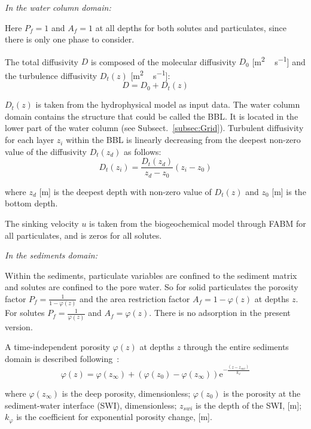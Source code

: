 \documentclass[gmd, manuscript]{copernicus}
\begin{document}
\emph{In the water column domain:}

Here $P_{f} = 1$ and $A_{f} = 1$ at all depths for both solutes and particulates, since there is only one phase to consider.

The total diffusivity $D$ is composed of the molecular diffusivity $D_{0}$ [\unit{m^{2}\,s^{-1}}] and the turbulence diffusivity $D_{t}(z)$ [\unit{m^{2}\,s^{-1}}]:
\begin{equation}
    D = D_{0} + D_{t}(z)
\end{equation}

$D_{t}(z)$ is taken from the hydrophysical model as input data.
The water column domain contains the structure that could be called the \textrm{BBL}.
It is located in the lower part of the water column (see Subsect.~\ref{subsec:Grid}).
Turbulent diffusivity for each layer $z_{i}$ within the BBL is linearly decreasing from the deepest non-zero value of the diffusivity $D_{t}(z_{d})$ as follows:
\begin{equation}
    D_{t}(z_{i}) = \frac{D_{t}(z_{d})}
    {z_{d} - z_{0}}
    (z_{i} - z_{0})
\end{equation}

where $z_{d}$ [\unit{m}] is the deepest depth with non-zero value of $D_{t}(z)$ and $z_{0}$ [\unit{m}] is the bottom depth.

The sinking velocity $u$ is taken from the biogeochemical model through \textrm{FABM} for all particulates, and is zeros for all solutes.

\emph{In the sediments domain:}

Within the sediments, particulate variables are confined to the sediment matrix and solutes are confined to the pore water.
So for solid particulates the porosity factor $P_{f} = \frac{1}{1 - \varphi(z)}$ and the area restriction factor $A_{f} = 1 - \varphi(z)$ at depths $z$.
For solutes $P_{f} = \frac{1}{\varphi(z)}$ and $A_{f} = \varphi(z)$.
There is no adsorption in the present version.

A time-independent porosity $\varphi(z)$ at depths $z$ through the entire sediments domain is described following~\citet{Soetaert1996}:
\begin{equation}
    \varphi(z) = \varphi(z_{\infty})
    + (\varphi(z_{0}) - \varphi(z_{\infty}))
    \mathrm{e}^{-\frac{(z - z_{swi})}{k_{\varphi}}}
\end{equation}

where $\varphi(z_{\infty})$ is the deep porosity, dimensionless;
$\varphi(z_{0})$ is the porosity at the sediment-water interface (\textrm{SWI}), dimensionless;
$z_{swi}$ is the depth of the \textrm{SWI}, [\unit{m}];
$k_{\varphi}$ is the coefficient for exponential porosity change, [\unit{m}].
\end{document}
